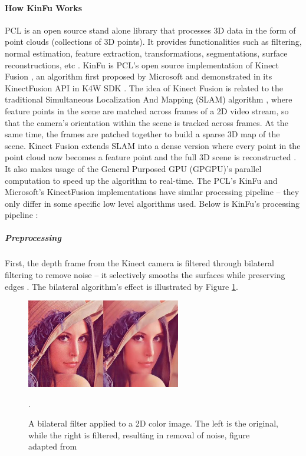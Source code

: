 \documentclass{ut-thesis}
\begin{document}
\paragraph{How KinFu Works}
PCL is an open source stand alone library that processes 3D data in the form of point clouds (collections of 3D points).  It provides functionalities such as filtering, normal estimation, feature extraction, transformations, segmentations, surface reconstructions, etc \cite{rusu20113d}.  KinFu is PCL's open source implementation of Kinect Fusion \cite{pirovano2011kinfu}, an algorithm first proposed by Microsoft and demonstrated in its KinectFusion API in K4W SDK \cite{newcombe2011kinectfusion}.  The idea of Kinect Fusion is related to the traditional Simultaneous Localization And Mapping (SLAM) algorithm \cite{pirovano2011kinfu}, where feature points in the scene are matched across frames of a 2D video stream, so that the camera's orientation within the scene is tracked across frames.  At the same time, the frames are patched together to build a sparse 3D map of the scene.  Kinect Fusion extends SLAM into a dense version where every point in the point cloud now becomes a feature point and the full 3D scene is reconstructed \cite{newcombe2011kinectfusion}. It also makes usage of the General Purposed GPU (GPGPU)'s parallel computation to speed up the algorithm to real-time.  The PCL's KinFu and Microsoft's KinectFusion implementations have similar processing pipeline -- they only differ in some specific low level algorithms used.  Below is KinFu's processing pipeline \cite{newcombe2011kinectfusion}:

\subparagraph{Preprocessing}
First, the depth frame from the Kinect camera is filtered through bilateral filtering to remove noise -- it selectively smooths the surfaces while preserving edges \cite{tomasi1998bilateral}.  The bilateral algorithm's effect is illustrated by Figure \ref{fig:bilateralFiltering}.
\begin{figure} [h]
	\centering
	\includegraphics[width=0.6\textwidth]{./img/bilateral_filtering.jpg}
	\caption{A bilateral filter applied to a 2D color image.  The left is the original, while the right is filtered, resulting in removal of noise, figure adapted from \cite{pirovano2011kinfu}}.
	\label{fig:bilateralFiltering}
\end{figure}
\end{document}
